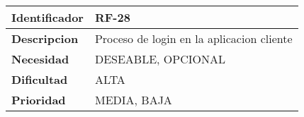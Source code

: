\begin{center}
    \begin{tabular}{|p{2.6cm}|p{12cm}|}
    \hline
    \textbf{Identificador} & RF-28\\
    \hline
    \textbf{Descripcion} & Proceso de login en la aplicacion cliente\\
    \hline
    \textbf{Necesidad} & DESEABLE, OPCIONAL\\
    \hline
    \textbf{Dificultad} & ALTA\\
    \hline
    \textbf{Prioridad} & MEDIA, BAJA\\
    \hline
    \end{tabular}
\end{center}
